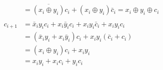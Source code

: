 \documentclass[12pt,openany]{book}
\newcommand*\xor{\oplus}
\begin{document}
\begin{itemize}
\begin{align*}
			      		      	        & = \overline{(x_i \xor y_i)}c_i + (x_i \xor y_i)\bar{c}_i = x_i \xor y_i \xor c_i           \\
			      		      	\\
			      		      	c_{i+1} & = \bar{x}_i y_i c_i + x_i \bar{y}_i c_i + x_i y_i \bar{c}_i + x_i y_i c_i                  \\
			      		      	        & = (\bar{x}_i y_i + x_i \bar{y}_i)c_i + x_i y_i(\bar{c}_i + c_i)                            \\
			      		      	        & = (x_i \xor y_i)c_i + x_i y_i                                                              \\
			      		      	        & = x_i y_i + x_i c_i + y_i c_i                                                              \\
			      		      \end{align*}
			      		      
			      		       
			      	\end{itemize}
			      	
\end{document}
